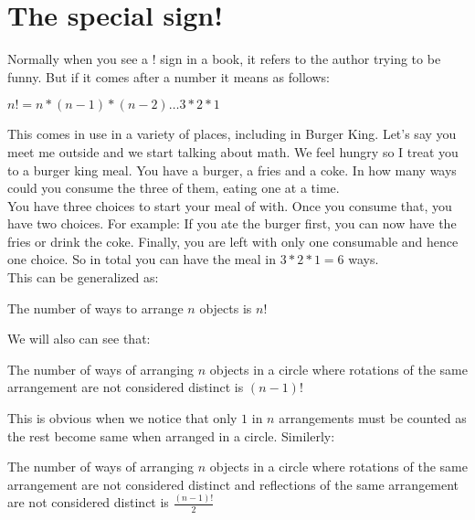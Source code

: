\section{The special sign!}
Normally when you see a ! sign in a book, it refers to the author trying to be funny. But if it comes after a number it means as follows:\\
\begin{definition}
    [Factorial]
    $n!=n*(n-1)*(n-2) \dots 3*2*1$\\
\end{definition}
This comes in use in a variety of places, including in Burger King. Let's say you meet me outside and we start talking about math. We feel hungry so I treat you to a burger king meal. You have a burger, a fries and a coke. In how many ways could you consume the three of them, eating one at a time.\\
You have three choices to start your meal of with. Once you consume that, you have two choices. For example: If you ate the burger first, you can now have the fries or drink the coke. Finally, you are left with only one consumable and hence one choice. So in total you can have the meal in $3*2*1=6$ ways.\\
This can be generalized as: 
\begin{theorem}
    The number of ways to arrange $n$ objects is $n!$\\
\end{theorem}
We will also can see that:
\begin{theorem}
The number of ways of arranging $n$ objects in a circle where rotations of the same arrangement are not considered distinct is $(n - 1)!$ \\
\end{theorem}
This is obvious when we notice that only $1$ in $n$ arrangements must be counted as the rest become same when arranged in a circle.  Similerly:
\begin{theorem}
The number of ways of arranging $n$ objects in a circle where rotations of the same arrangement are not considered distinct and reflections of the same arrangement are not considered distinct is $\frac{(n-1)!}{2}$
\end{theorem}
